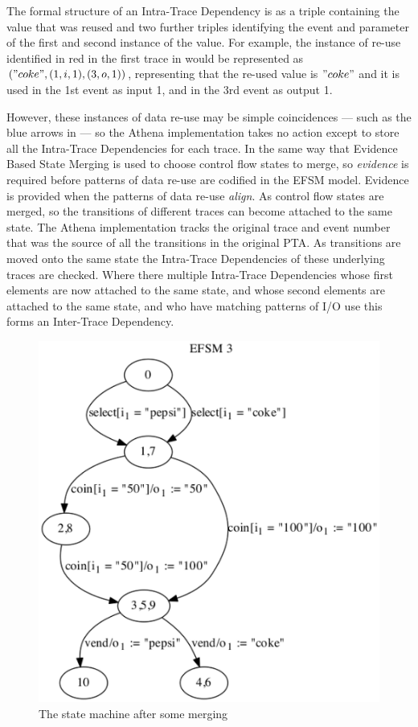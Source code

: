 The formal structure of an Intra-Trace Dependency is as a triple containing the value that was reused and two further triples identifying the event and parameter of the first and second instance of the value. For example, the instance of re-use identified in red in the first trace in  would be represented as $("coke",(1,i,1),(3,o,1))$, representing that the re-used value is $"coke"$ and it is used in the 1st event as input 1, and in the 3rd event as output 1.

However, these instances of data re-use may be simple coincidences --- such as the blue arrows in  --- so the Athena implementation takes no action except to store all the Intra-Trace Dependencies for each trace. In the same way that Evidence Based State Merging is used to choose control flow states to merge, so \emph{evidence} is required before patterns of data re-use are codified in the EFSM model. Evidence is provided when the patterns of data re-use \emph{align}. As control flow states are merged, so the transitions of different traces can become attached to the same state. The Athena implementation tracks the original trace and event number that was the source of all the transitions in the original PTA. As transitions are moved onto the same state the Intra-Trace Dependencies of these underlying traces are checked. Where there multiple Intra-Trace Dependencies whose first elements are now attached to the same state, and whose second elements are attached to the same state, and who have matching patterns of I/O use this forms an Inter-Trace Dependency. 

\begin{figure}[h]
\begin{center}
\includegraphics[width=12cm]{figures/efsm/predata.eps}
\caption{The state machine after some merging}
\label{fig:predata}
\end{center}
\end{figure}

